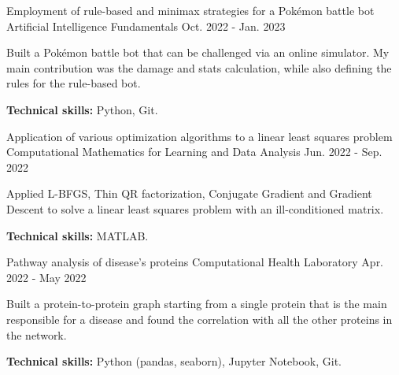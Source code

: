 

\begin{cventries}

\cventry
{Employment of rule-based and minimax strategies for a Pokémon battle bot} %
{Artificial Intelligence Fundamentals} %
{} %
{Oct. 2022 - Jan. 2023} %
{
    \begin{cvitems}
        \item{Built a Pokémon battle bot that can be challenged via an online simulator. My main contribution was the damage and stats calculation, while also defining the rules for the rule-based bot.}
        \item{\textbf{Technical skills:} Python, Git.}
    \end{cvitems}
}

\cventry
{Application of various optimization algorithms to a linear least squares problem} %
{Computational Mathematics for Learning and Data Analysis} %
{} %
{Jun. 2022 - Sep. 2022} %
{
    \begin{cvitems}
        \item{Applied L-BFGS, Thin QR factorization, Conjugate Gradient and Gradient Descent to solve a linear least squares problem with an ill-conditioned matrix.}
        \item{\textbf{Technical skills:} MATLAB.}
    \end{cvitems}
}

\cventry
{Pathway analysis of disease's proteins} %
{Computational Health Laboratory} %
{} %
{Apr. 2022 - May 2022} %
{
    \begin{cvitems}
        \item{Built a protein-to-protein graph starting from a single protein that is the main responsible for a disease and found the correlation with all the other proteins in the network.}
        \item{\textbf{Technical skills:} Python (pandas, seaborn), Jupyter Notebook, Git.}
    \end{cvitems}
}


\end{cventries}
